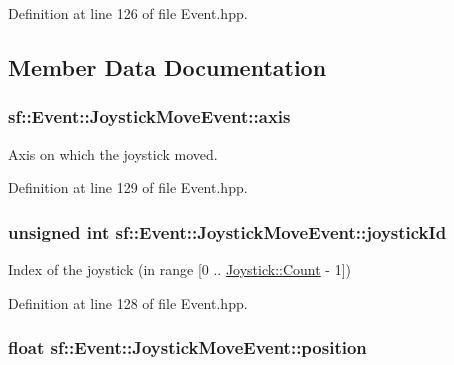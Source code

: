 Definition at line 126 of file Event.\-hpp.



\subsection{Member Data Documentation}
\hypertarget{structsf_1_1_event_1_1_joystick_move_event_add22e8126b7974271991dc6380cbdee3}{
\subsubsection[{axis}]{ sf\-::\-Event\-::\-Joystick\-Move\-Event\-::axis}}\label{structsf_1_1_event_1_1_joystick_move_event_add22e8126b7974271991dc6380cbdee3}


Axis on which the joystick moved. 



Definition at line 129 of file Event.\-hpp.

\hypertarget{structsf_1_1_event_1_1_joystick_move_event_a7bf2b2f2941a21ed26a67c95f5e4232f}{
\subsubsection[{joystick\-Id}]{\setlength{\rightskip}{0pt plus 5cm}unsigned int sf\-::\-Event\-::\-Joystick\-Move\-Event\-::joystick\-Id}}\label{structsf_1_1_event_1_1_joystick_move_event_a7bf2b2f2941a21ed26a67c95f5e4232f}


Index of the joystick (in range \mbox{[}0 .. \hyperlink{classsf_1_1_joystick_ac4ca4ee36e2cf04ecf931316e4463ca6a6e0a2a95bc1da277610c04d80f52715e}{Joystick\-::\-Count} -\/ 1\mbox{]}) 



Definition at line 128 of file Event.\-hpp.

\hypertarget{structsf_1_1_event_1_1_joystick_move_event_aba5a70815420161375fd2e756689c32a}{
\subsubsection[{position}]{\setlength{\rightskip}{0pt plus 5cm}float sf\-::\-Event\-::\-Joystick\-Move\-Event\-::position}}\label{structsf_1_1_event_1_1_joystick_move_event_aba5a70815420161375fd2e756689c32a}


